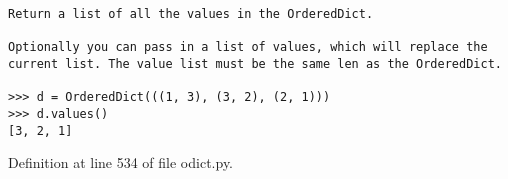 \footnotesize\begin{verbatim}
Return a list of all the values in the OrderedDict.

Optionally you can pass in a list of values, which will replace the
current list. The value list must be the same len as the OrderedDict.

>>> d = OrderedDict(((1, 3), (3, 2), (2, 1)))
>>> d.values()
[3, 2, 1]
\end{verbatim}
\normalsize
 

Definition at line 534 of file odict.py.